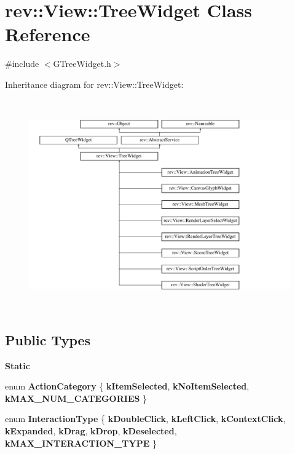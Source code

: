 \hypertarget{classrev_1_1_view_1_1_tree_widget}{}\section{rev\+::View\+::Tree\+Widget Class Reference}
\label{classrev_1_1_view_1_1_tree_widget}


{\ttfamily \#include $<$G\+Tree\+Widget.\+h$>$}

Inheritance diagram for rev\+::View\+::Tree\+Widget\+:\begin{figure}[H]
\begin{center}
\leavevmode
\includegraphics[height=9.085546cm]{classrev_1_1_view_1_1_tree_widget}
\end{center}
\end{figure}
\subsection*{Public Types}
\begin{Indent}\textbf{ Static}\par
\begin{DoxyCompactItemize}
\item 
\mbox{\label{classrev_1_1_view_1_1_tree_widget_a625cc8ac99b24ea244499e5a70990bec}} 
enum {\bfseries Action\+Category} \{ {\bfseries k\+Item\+Selected}, 
{\bfseries k\+No\+Item\+Selected}, 
{\bfseries k\+M\+A\+X\+\_\+\+N\+U\+M\+\_\+\+C\+A\+T\+E\+G\+O\+R\+I\+ES}
 \}
\item 
\mbox{\label{classrev_1_1_view_1_1_tree_widget_abe140482c2589f963d38d2ebf196fcd2}} 
enum {\bfseries Interaction\+Type} \{ \newline
{\bfseries k\+Double\+Click}, 
{\bfseries k\+Left\+Click}, 
{\bfseries k\+Context\+Click}, 
{\bfseries k\+Expanded}, 
\newline
{\bfseries k\+Drag}, 
{\bfseries k\+Drop}, 
{\bfseries k\+Deselected}, 
{\bfseries k\+M\+A\+X\+\_\+\+I\+N\+T\+E\+R\+A\+C\+T\+I\+O\+N\+\_\+\+T\+Y\+PE}
 \}
\end{DoxyCompactItemize}
\end{Indent}
